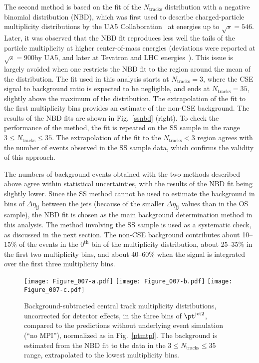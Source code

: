 \documentclass[11pt,twoside,a4paper,cmspaper,final,collab]{cms-tdr}
\begin{document}
The second method is based on the fit of the $N_\text{tracks}$ distribution with a negative binomial distribution (NBD), which was first used to describe charged-particle multiplicity distributions by the UA5 Collaboration~\cite{ua5} at energies up to $\sqrt{s} = 546$\GeV. Later, it was observed that the NBD fit reproduces less well the tails of the particle multiplicity at higher center-of-mass energies (deviations were reported at $\sqrt{s} = 900$\GeV by UA5, and later at Tevatron and LHC energies~\cite{ua5failstart, d02, alice}). This issue is largely avoided when one restricts the NBD fit to the region around the mean of the distribution. The fit used in this analysis starts at $N_\text{tracks} = 3$, where the CSE signal to background ratio is expected to be negligible, and ends at $N_\text{tracks} = 35$, slightly above the maximum of the distribution. The extrapolation of the fit to the first multiplicity bins provides an estimate of the non-CSE background. The results of the NBD fits are shown in Fig.~\ref{ssnbd} (right). To check the performance of the method, the fit is repeated on the SS sample in the range $3 \le N_\text{tracks} \le 35$. The extrapolation of the fit to the $N_\text{tracks} < 3$ region agrees with the number of events observed in the SS sample data, which confirms the validity of this approach.

The numbers of background events obtained with the two methods described above agree within statistical uncertainties, with the results of the NBD fit being slightly lower. Since the SS method cannot be used to estimate the background in bins of $\Delta\eta_\mathrm{jj}$ between the jets (because of the smaller $\Delta\eta_\mathrm{jj}$ values than in the OS sample), the NBD fit is chosen as the main background determination method in this analysis. The method involving the SS sample is used as a systematic check, as discussed in the next section.
The non-CSE background contributes about 10--15\% of the events in the $0^\mathrm{th}$ bin of the multiplicity distribution, about 25--35\% in the first two multiplicity bins, and about 40--60\% when the signal is integrated over the first three multiplicity bins.

\begin{figure}
\centering
\texttt{[image: Figure\_007-a.pdf]}
\texttt{[image: Figure\_007-b.pdf]}
\texttt{[image: Figure\_007-c.pdf]}
\caption{Background-subtracted central track multiplicity distributions, uncorrected for detector effects, in the three bins of $\pt^\text{jet2}$, compared to the  predictions without underlying event simulation (``no MPI''), normalized as in Fig.~\ref{ptmtpl}. The background is estimated from the NBD fit to the data in the $3 \le N_\text{tracks} \le 35$ range, extrapolated to the lowest multiplicity bins.}
\label{subpt}
\end{figure}
\end{document}

